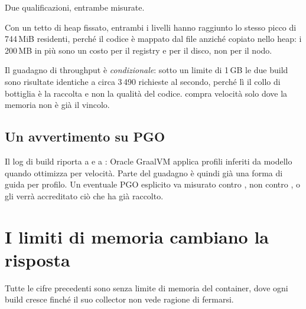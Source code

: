 Due qualificazioni, entrambe misurate.

Con un tetto di heap fissato, entrambi i livelli hanno raggiunto lo stesso picco
di 744\,MiB residenti, perch\'e il codice \`e mappato dal file anzich\'e copiato
nello heap: i 200\,MB in pi\`u sono un costo per il registry e per il disco, non
per il nodo.

Il guadagno di throughput \`e \emph{condizionale}: sotto un limite di 1\,GB le
due build sono risultate identiche a circa 3\,490 richieste al secondo, perch\'e
l\`i il collo di bottiglia \`e la raccolta e non la qualit\`a del codice.
 compra velocit\`a solo dove la memoria non \`e gi\`a il vincolo.

\subsection{Un avvertimento su PGO}

Il log di build riporta  a  e
 a : Oracle GraalVM applica profili inferiti da
modello quando ottimizza per velocit\`a. Parte del guadagno \`e quindi gi\`a una
forma di guida per profilo. Un eventuale PGO esplicito va misurato contro
, non contro , o gli verr\`a accreditato ci\`o che
 ha gi\`a raccolto.

\section{I limiti di memoria cambiano la risposta}

Tutte le cifre precedenti sono senza limite di memoria del container, dove ogni
build cresce finch\'e il suo collector non vede ragione di fermarsi.

